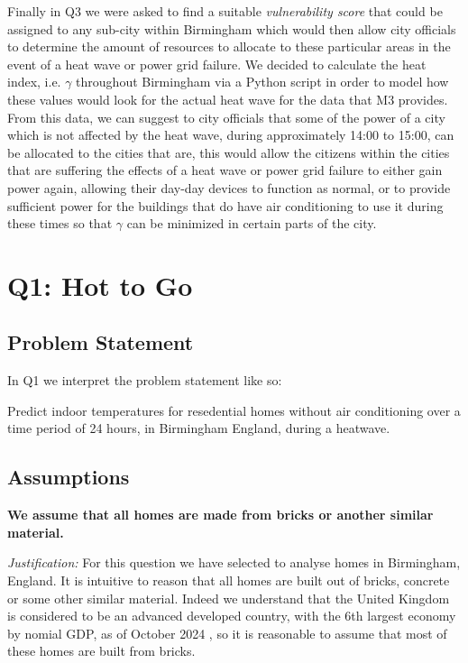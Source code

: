 \documentclass[11pt]{article}
\begin{document}
Finally in Q3 we were asked to find a suitable \textit{vulnerability score} that could be assigned to any sub-city within Birmingham which would then allow city officials to determine the amount of resources to allocate to these particular areas in the event of a heat wave or power grid failure. We decided to calculate the heat index, i.e. $\gamma$ throughout Birmingham via a Python script in order to model how these values would look for the actual heat wave for the data that M3 provides. From this data, we can suggest to city officials that some of the power of a city which is not affected by the heat wave, during approximately 14:00 to 15:00, can be allocated to the cities that are, this would allow the citizens within the cities that are suffering the effects of a heat wave or power grid failure to either gain power again, allowing their day-day devices to function as normal, or to provide sufficient power for the buildings that do have air conditioning to use it during these times so that $\gamma$ can be minimized in certain parts of the city.

\newpage
\tableofcontents
\newpage

\section{Q1: Hot to Go}

\subsection{Problem Statement}

In Q1 we interpret the problem statement like so:

Predict indoor temperatures for resedential homes without air conditioning over a time period of
24 hours, in Birmingham England, during a heatwave.

\subsection{Assumptions}

\textbf{\sffamily We assume that all homes are made from bricks or another similar material.}

\textit{Justification:} For this question we have selected to analyse homes in Birmingham, England. It is intuitive
to reason that all homes are built out of bricks, concrete or some other similar material. Indeed we understand that
the United Kingdom is considered to be an advanced developed country, with the 6th largest economy by nomial GDP, as
of October 2024 \cite{imf}, so it is reasonable to assume that most of these homes are built from bricks.
\end{document}
